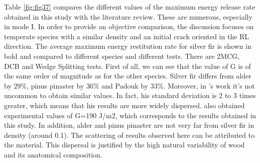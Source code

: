Table \ref{fig:fig37} compares the different values of the maximum energy release rate obtained in this study with the literature review. These are numerous, especially in mode I. In order to provide an objective comparison, the discussion focuses on temperate species with a similar density and an initial crack oriented in the RL direction. The average maximum energy restitution rate for silver fir is shown in bold and compared to different species and different tests. There are 2MCG, DCB and Wedge Splitting tests.
First of all, we can see that the value of G is of the same order of magnitude as for the other species. Silver fir differs from alder by $29 \%$, pinus pinaster by $36 \%$ and Padouk by $33 \%$. Moreover, in \cite{Odounga2018phd}'s work it's not uncommon to obtain similar values. In fact, his standard deviation is 2 to 3 times greater, which means that his results are more widely dispersed.
\cite{Xavieretal2014} also obtained experimental values of G=190 J/m2, which corresponds to the results obtained in this study. In addition, alder and pinus pinaster are not very far from silver fir in density (around 0.1).
The scattering of results observed here can be attributed to the material. This dispersal is justified by the high natural variability of wood and its anatomical composition.

